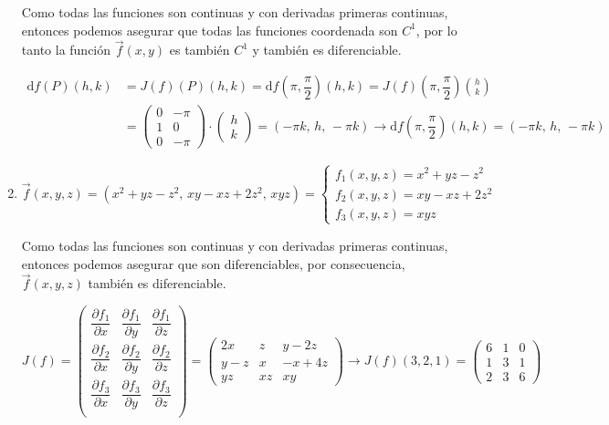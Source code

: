 \begin{enumerate}[label=\color{red}\textbf{\arabic*)}, leftmargin=*]
Como todas las funciones son continuas y con derivadas primeras continuas, entonces podemos asegurar que todas las funciones coordenada son $C^{1}$, por lo tanto la función $\vec{f}(x,y)$ es también $C^{1}$ y también es diferenciable.

\[ \begin{aligned}
\mathrm{d}f(P)(h,k)&=J(f)(P)(h,k)=\mathrm{d}f\left(\pi,\dfrac{\pi}{2}\right)(h,k)=J(f)\left(\pi,\dfrac{\pi}{2}\right)\binom{h}{k}\\
&=\begin{pmatrix}
0 & -\pi \\ 
1 & 0 \\ 
0 & -\pi
\end{pmatrix}\cdot\begin{pmatrix}
h\\
k
\end{pmatrix}=\left(-\pi k,\,h,\,-\pi k\right)\longrightarrow \mathrm{d}f\left(\pi,\dfrac{\pi}{2}\right)(h,k)=\left(-\pi k,\,h,\,-\pi k\right)
\end{aligned} \]

\item {}

$\vec{f}(x,y,z)=(x^{2}+yz-z^{2},\, xy-xz+2z^{2},\, xyz)=\begin{cases}
f_1(x,y,z)=x^{2}+yz-z^{2}\\
f_2(x,y,z)=xy-xz+2z^{2}\\
f_3(x,y,z)=xyz
\end{cases}$

Como todas las funciones son continuas y con derivadas primeras continuas, entonces podemos asegurar que son diferenciables, por consecuencia, $\vec{f}(x,y,z)$ también es diferenciable.

$J(f)=\begin{pmatrix}
\dfrac{\partial f_{1}}{\partial x} & \dfrac{\partial f_1}{\partial y} & \dfrac{\partial f_1}{\partial z} \\ 
\dfrac{\partial f_{2}}{\partial x} & \dfrac{\partial f_2}{\partial y} & \dfrac{\partial f_2}{\partial z} \\ 
\dfrac{\partial f_{3}}{\partial x} & \dfrac{\partial f_3}{\partial y} & \dfrac{\partial f_3}{\partial z} \\ 
\end{pmatrix}=\begin{pmatrix}
2x & z & y-2z \\
y-z & x & -x+4z \\
yz & xz & xy
\end{pmatrix}\longrightarrow J(f)(3,2,1)=\begin{pmatrix}
6 & 1 & 0 \\
1 & 3 & 1 \\
2 & 3 & 6
\end{pmatrix}$


\end{enumerate}
